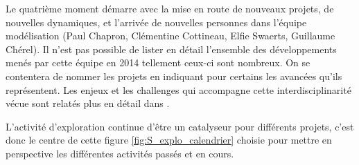 Le quatrième moment démarre avec la mise en route de nouveaux projets, de nouvelles dynamiques, et l'arrivée de nouvelles personnes dans l'équipe modélisation (Paul Chapron, Clémentine Cottineau, Elfie Swaerts, Guillaume Chérel). Il n'est pas possible de lister en détail l'ensemble des développements menés par cette équipe en 2014 tellement ceux-ci sont nombreux. On se contentera de nommer les projets en indiquant pour certains les avancées qu'ils représentent. Les enjeux et les challenges qui accompagne cette interdisciplinarité vécue sont relatés plus en détail dans \textcite{Chapron2014}.

L'activité d'exploration continue d'être un catalyseur pour différents projets, c'est donc le centre de cette figure \ref{fig:S_explo_calendrier} choisie pour mettre en perspective les différentes activités passés et en cours. 

